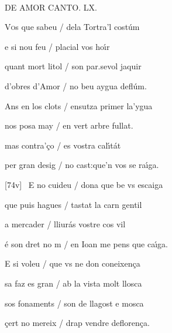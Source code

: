 \documentclass[12pt]{article}
\renewcommand{\espaiAbansEtiquetaPoema}{\vspace{0ex}}
\begin{document}
\begin{estrofa}

\espaiAbansEtiquetaPoema

\\

\begin{rubrica}

DE AMOR CANTO. LX.

\end{rubrica}

\end{estrofa}


\begin{estrofa}

 V\textsc{o}s que sabeu / dela Tortra'l cost\'{u}m

 e si nou feu / placial vos ho\'{\i}r

 quant mort litol / son par.sevol jaquir

 d'obres d'Amor / no beu aygua defl\'{u}m.

 Ans en los clots / ensutza primer la'ygua

 nos posa may / en vert arbre fullat.

 mas contra'\c{c}o / es vostra cal\'{\i}t\'{a}t

 per gran desig / no cast:que'n vos se ra\'{\i}ga.

\end{estrofa}



\begin{estrofa}

 [74v] \textparagraph\  E no cuideu / dona que be vs escaiga

 que puis hagues / tastat la carn gentil

 a mercader / lliur\'{a}s vostre cos vil

 \'{e} son dret no m / en Ioan me pens que ca\'{\i}ga.

 E si voleu / que vs ne don coneixen\c{c}a

 sa faz es gran / ab la vista molt llosca

 sos fonaments / son de llagost e mosca

 \c{c}ert no mereix / drap vendre defloren\c{c}a.

\end{estrofa}
\end{document}
